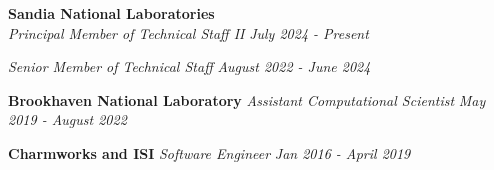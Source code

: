 \textbf{Sandia National Laboratories}\\
\textit{Principal Member of Technical Staff II} \hfill \textit{July 2024 - Present}
\noindent
\begin{itemize}\onlyitems[include={1,2}]
\myExpOne
\end{itemize}

\noindent
\textit{Senior Member of Technical Staff} \hfill \textit{August 2022 - June 2024}
\begin{itemize}
\myExpTwo 
\end{itemize} 
\textbf{Brookhaven National Laboratory}\hfill
\textit{Assistant Computational Scientist} \hfill \textit{May 2019 - August 2022}
\begin{itemize}
\myExpThree
\end{itemize}

\noindent
\textbf{Charmworks and ISI}\hfill
\textit{Software Engineer} \hfill \textit{Jan 2016 - April 2019}
\vspace{-0.02in}
\begin{itemize}
\myExpFour
\end{itemize}
\noindent


